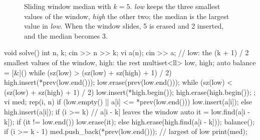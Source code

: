 \begin{figure}[htbp]
\centering
{}
\caption{Sliding window median with $k = 5$. \emph{low} keeps the three smallest values of the window, \emph{high} the other
two; the median is the largest value in \emph{low}. When the window slides, 5 is erased and 2 inserted, and the median
becomes 3.}
\label{fig:slidingmedian}
\end{figure}

\begin{code}
void solve() {
    int n, k;
    cin >> n >> k;
    vi a(n);
    cin >> a;
    // low: the (k + 1) / 2 smallest values of the window, high: the rest
    multiset<ll> low, high;
    auto balance = [&]() {
        while (sz(low) > (sz(low) + sz(high) + 1) / 2) {
            high.insert(*prev(low.end()));
            low.erase(prev(low.end()));
        }
        while (sz(low) < (sz(low) + sz(high) + 1) / 2) {
            low.insert(*high.begin());
            high.erase(high.begin());
        }
    };
    vi med;
    rep(i, n) {
        if (low.empty() || a[i] <= *prev(low.end())) low.insert(a[i]);
        else high.insert(a[i]);
        if (i >= k) {  // a[i - k] leaves the window
            auto it = low.find(a[i - k]);
            if (it != low.end()) low.erase(it);
            else high.erase(high.find(a[i - k]));
        }
        balance();
        if (i >= k - 1) med.push_back(*prev(low.end()));  // largest of low
    }
    print(med);
}
\end{code}

